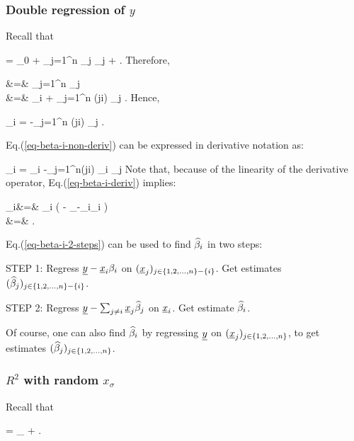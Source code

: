 \subsubsection{Double regression
 of $y$}

Recall that

\beq
\rvy = \beta_0 + \sum_{j=1}^n \rvx_j \beta_j + \ul{\eps}
\;.
\eeq
Therefore,

\beqa
{}
&=&
\sum_{j=1}^n \beta_j
\\
&=&
 \beta_i
+
\sum_{j=1}^n
\indi(j\neq i)
 \beta_j
\;.
\eeqa
Hence,

\beq
\beta_i
=
{}
-\sum_{j=1}^n
\indi(j\neq i)
{}
\beta_j
\;.
\label{eq-beta-i-non-deriv}
\eeq

Eq.(\ref{eq-beta-i-non-deriv})
can be expressed
in derivative notation as:

\beq
\beta_i
=
\pder{\rvy}
{\rvx_i}
-\sum_{j=1}^n\indi(j\neq i)
{\rvx_i}
\beta_j
\label{eq-beta-i-deriv}
\eeq
Note that,
because of the
linearity of the derivative operator,
Eq.(\ref{eq-beta-i-deriv})
implies:

\beqa
\beta_i&=&
\pder{}
{\rvx_i}
\left(\rvy
-
_{\rvy-\rvx_i\beta_i}
\right)
\\
&=&
\rvy
\label{eq-beta-i-2-steps}
\;.
\eeqa

Eq.(\ref{eq-beta-i-2-steps})
can be used to find
${\widehat{\beta}}_i$
in two steps:

STEP 1: Regress ${\underline{y}}-{\underline{x}}_i\beta_i$
on $({\underline{x}}_j)_{j\in \{1,2,\ldots, n\}- \{ i\}}$.
Get estimates
$({\widehat{\beta}}_j)_{j\in \{1,2,
\ldots, n\}- \{ i\}}$.

STEP 2: Regress ${\underline{y}}-\sum_{j\neq i} {\underline{x}}_j{\widehat{\beta}}_j$ on ${\underline{x}}_i$.
Get estimate ${\widehat{\beta}}_i$.

Of course, one can also
find ${\widehat{\beta}}_i$
by regressing ${\underline{y}}$
on $({\underline{x}}_j)_{j\in \{1,2,
\ldots, n\}}$, to get
estimates
$({\widehat{\beta}}_j)_{j\in \{1,2,
\ldots, n\}}$.

\subsubsection{$R^2$ with random $x_\sigma$}

Recall that

\beq
\rvy =
_{\HAT{\rvy}}
+\ul{\eps}
\;.
\eeq


